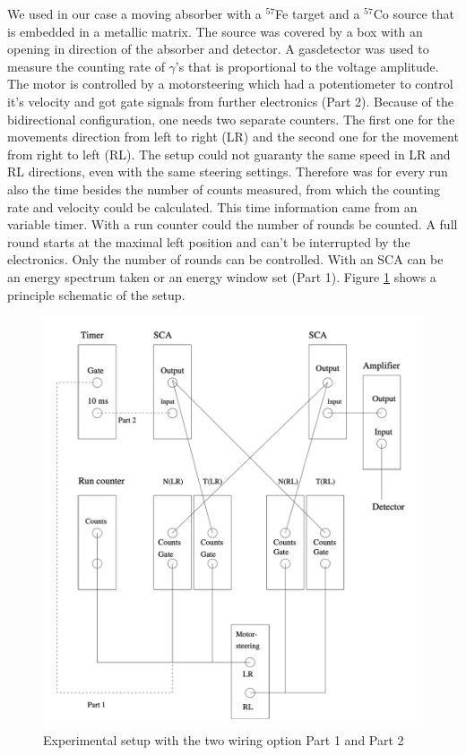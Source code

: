 \documentclass[11pt,a4paper,notitlepage]{scrartcl}
\begin{document}
We used in our case a moving absorber with a $^{57}$Fe target and a $^{57}$Co source that is embedded in a metallic matrix. The source was covered by a box with an opening in direction of the absorber and detector. A gasdetector was used to measure the counting rate of $\gamma$'s that is proportional to the voltage amplitude. The motor is controlled by a motorsteering which had a potentiometer to control it's velocity and got gate signals from further electronics (Part 2). Because of the bidirectional configuration, one needs two separate counters. The first one for the movements direction from left to right (LR) and the second one for the movement from right to left (RL). The setup could not guaranty the same speed in LR and RL directions, even with the same steering settings. Therefore was for every run also the time besides the number of counts measured, from which the counting rate and velocity could be calculated. This time information came from an variable timer. With a run counter could the number of rounds be counted. A full round starts at the maximal left position and can't be interrupted by the electronics.  Only the number of rounds can be controlled. With an SCA can be an energy spectrum taken or an energy window set (Part 1). Figure \ref{fig:setup} shows a principle schematic of the setup. \cite{manual}
\begin{figure}[H]
	\centering
	\includegraphics[width=\linewidth]{figs/setup.png}
	\caption{Experimental setup with the two wiring option Part 1 and Part 2 \cite{manual}}\label{fig:setup}
\end{figure}
\newpage
\end{document}
